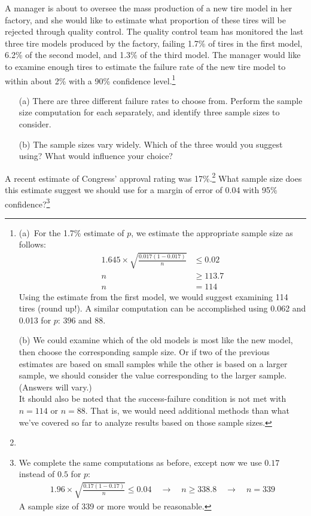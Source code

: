\begin{exercise}
A manager is about to oversee the mass production of a new tire model in her factory, and she would like to estimate what proportion of these tires will be rejected through quality control. The quality control team has monitored the last three tire models produced by the factory, failing 1.7\% of tires in the first model, 6.2\% of the second model, and 1.3\% of the third model. The manager would like to examine enough tires to estimate the failure rate of the new tire model to within about 2\% with a 90\% confidence level.\footnote{(a)~For the 1.7\% estimate of $p$, we estimate the appropriate sample size as follows:
\begin{align*}
1.645\times \sqrt{\frac{0.017(1-0.017)}{n}} &\leq 0.02 \\
n &\geq 113.7 \\
n&=114
\end{align*}
Using the estimate from the first model, we would suggest examining 114 tires (round up!). A similar computation can be accomplished using 0.062 and 0.013 for $p$: 396 and 88. \par
(b) We could examine which of the old models is most like the new model, then choose the corresponding sample size. Or if two of the previous estimates are based on small samples while the other is based on a larger sample, we should consider the value corresponding to the larger sample. (Answers will vary.) \\
\indent It should also be noted that the success-failure condition is not met with $n = 114$ or $n = 88$. That is, we would need additional methods than what we've covered so far to analyze results based on those sample sizes.}
\begin{itemize}
\setlength{\itemsep}{0mm}
\item[(a)] There are three different failure rates to choose from. Perform the sample size computation for each separately, and identify three sample sizes to consider.
\item[(b)] The sample sizes vary widely. Which of the three would you suggest using? What would influence your choice?
\end{itemize}
\end{exercise}


\begin{exercise}
A recent estimate of Congress' approval rating was 17\%.\footnote{} What sample size does this estimate suggest we should use for a margin of error of 0.04 with 95\% confidence?\footnote{We complete the same computations as before, except now we use $0.17$ instead of $0.5$ for $p$:
\begin{align*}
1.96\times \sqrt{\frac{0.17(1-0.17)}{n}} \leq 0.04
\quad\rightarrow\quad
n \geq 338.8
\quad\rightarrow\quad
n = 339
\end{align*}
A sample size of 339 or more would be reasonable.}


\end{exercise}


